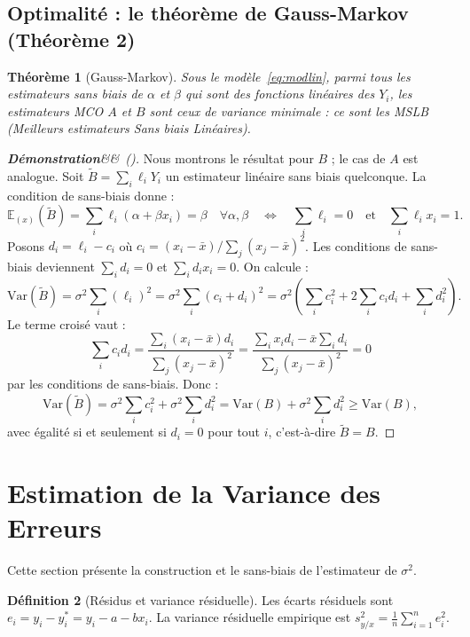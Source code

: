 \documentclass[12pt,a4paper]{article}
\newtheorem{theoreme}{Théorème}[section]
\theoremstyle{definition}
\newtheorem{definition}[theoreme]{Définition}
\theoremstyle{remark}
\newenvironment{demonstration}[1][]
  {\begin{proof}[\textbf{Démonstration}\ifx&#1&\else\ (#1)\fi]}
  {\end{proof}}
\newcommand{\Esp}{\mathbb{E}}
\newcommand{\Var}{\mathrm{Var}}
\newcommand{\xbar}{\bar{x}}
\begin{document}
\subsection{Optimalité : le théorème de Gauss-Markov (Théorème 2)}

\begin{theoreme}[Gauss-Markov]
\label{thm:gm}
Sous le modèle~\eqref{eq:modlin}, parmi tous les estimateurs sans biais de $\alpha$
et $\beta$ qui sont des fonctions linéaires des $Y_i$, les estimateurs MCO $A$ et $B$
sont ceux de variance minimale : ce sont les MSLB (Meilleurs estimateurs Sans biais Linéaires).
\end{theoreme}

\begin{demonstration}
Nous montrons le résultat pour $B$ ; le cas de $A$ est analogue.
Soit $\widetilde{B} = \sum_i \ell_i Y_i$ un estimateur linéaire sans biais quelconque.
La condition de sans-biais donne :
\[
  \Esp_{(x)}(\widetilde{B}) = \sum_i \ell_i(\alpha + \beta x_i) = \beta
  \quad \forall \alpha, \beta
  \quad \Longleftrightarrow \quad
  \sum_i \ell_i = 0 \quad \text{et} \quad \sum_i \ell_i x_i = 1.
\]
Posons $d_i = \ell_i - c_i$ où $c_i = (x_i - \xbar)/\sum_j(x_j-\xbar)^2$.
Les conditions de sans-biais deviennent $\sum_i d_i = 0$ et $\sum_i d_i x_i = 0$.
On calcule :
\[
  \Var(\widetilde{B}) = \sigma^2\sum_i(\ell_i)^2 = \sigma^2\sum_i(c_i + d_i)^2
  = \sigma^2\!\left(\sum_i c_i^2 + 2\sum_i c_i d_i + \sum_i d_i^2\right).
\]
Le terme croisé vaut :
\[
  \sum_i c_i d_i = \frac{\sum_i(x_i-\xbar)d_i}{\sum_j(x_j-\xbar)^2}
                = \frac{\sum_i x_i d_i - \xbar\sum_i d_i}{\sum_j(x_j-\xbar)^2} = 0
\]
par les conditions de sans-biais.
Donc :
\[
  \Var(\widetilde{B}) = \sigma^2\sum_i c_i^2 + \sigma^2\sum_i d_i^2
                      = \Var(B) + \sigma^2\sum_i d_i^2 \geq \Var(B),
\]
avec égalité si et seulement si $d_i = 0$ pour tout $i$, c'est-à-dire
$\widetilde{B} = B$.
\end{demonstration}





\section{Estimation de la Variance des Erreurs}
\label{sec:sigma}

Cette section présente la construction et le sans-biais de l'estimateur de $\sigma^2$.

\begin{definition}[Résidus et variance résiduelle]
Les écarts résiduels sont $e_i = y_i - y_i^* = y_i - a - bx_i$.
La variance résiduelle empirique est $s_{y/x}^2 = \frac{1}{n}\sum_{i=1}^n e_i^2$.
\end{definition}
\end{document}
